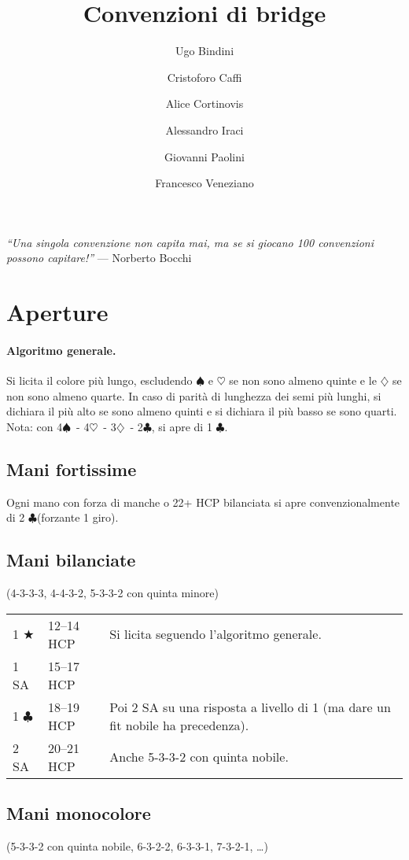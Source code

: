 \documentclass[a4paper,10pt]{article}
\title{Convenzioni di bridge}
\author{Ugo Bindini \and Cristoforo Caffi \and Alice Cortinovis \and Alessandro Iraci \and Giovanni Paolini \and Francesco Veneziano}
\renewcommand{\c}{$\clubsuit$\xspace}
\renewcommand{\d}{$\diamondsuit$\xspace}
\newcommand{\h}{$\heartsuit$\xspace}
\newcommand{\s}{$\spadesuit$\xspace}
\renewcommand{\j}{$\bigstar$\xspace}
\newcommand{\sa}{SA\xspace}
\newcommand{\smallspace}{\vskip0.3cm}
\newenvironment{threecol}
  {\smallspace\noindent\begin{tabular}{l l p{0.78\textwidth}}}
  {\end{tabular}\smallspace}
\begin{document}
\maketitle


\tableofcontents

\pagebreak

\emph{``Una singola convenzione non capita mai, ma se si giocano 100 convenzioni possono capitare!''} --- Norberto Bocchi

\section{Aperture}

\paragraph{Algoritmo generale.}
Si licita il colore più lungo, escludendo \s e \h se non sono almeno quinte e le \d se non sono almeno quarte.
In caso di parità di lunghezza dei semi più lunghi, si dichiara il più alto se sono almeno quinti e si dichiara il più basso se sono quarti.
Nota: con 4\s\ - 4\h\ - 3\d\ - 2\c, si apre di 1 \c.

\subsection{Mani fortissime}

Ogni mano con forza di manche o 22+ HCP bilanciata si apre convenzionalmente di 2 \c (forzante 1 giro).

\subsection{Mani bilanciate}
(4-3-3-3, 4-4-3-2, 5-3-3-2 con quinta minore)
\smallspace

\begin{threecol}
 1 \j & 12--14 HCP & Si licita seguendo l'algoritmo generale. \\
 1 \sa & 15--17 HCP & \\
 1 \c & 18--19 HCP & Poi 2 \sa su una risposta a livello di 1 (ma dare un fit nobile ha precedenza). \\
 2 \sa & 20--21 HCP & Anche 5-3-3-2 con quinta nobile.
\end{threecol}


\subsection{Mani monocolore}
(5-3-3-2 con quinta nobile, 6-3-2-2, 6-3-3-1, 7-3-2-1, \dots)
\end{document}
